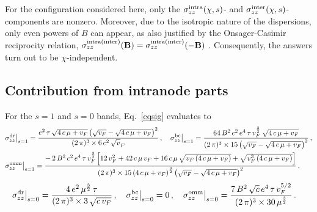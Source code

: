 \documentclass[aps,prb,onecolumn,nofootinbib,citeautoscript,10pt]{revtex4-2}
\def \nn{\nonumber \\}
\begin{document}
For the configuration considered here, only the $\sigma^{\rm intra}_{zz} (\chi, s)$- and $\sigma^{\rm inter}_{zz} (\chi, s)$-components are nonzero. Moreover, due to the isotropic nature of the dispersions, only even powers of $B$ can appear, as also justified by the Onsager-Casimir reciprocity relation, $\sigma^{\rm intra(inter)}_{zz} (\mathbf{B})= \sigma^{\rm intra(inter)}_{zz} (-\mathbf{B})$ \cite{onsager31_reciprocal, onsager2, onsager3}. Consequently, the answers turn out to be $\chi$-independent.


\subsection{Contribution from intranode parts}


For the $s=1$ and $s=0$ bands, Eq.~\eqref{eqsig} evaluates to
\begin{align}
&  \sigma_{zz}^{\rm dr} \big \vert_{s=1} =
\frac{e^2\, \tau \, \sqrt{ 4 \, c \, \mu  + v_F } 
\left(\sqrt{v_F}-\sqrt{4 \, c \, \mu +v_F}\right)^2} 
{(2\,\pi)^3 \times 6 \, c^2 \, \sqrt v_F}
\,, \quad
\sigma_{zz}^{\rm bc} \big \vert_{s=1} =
\frac{64 \,B^2 \,c^2 \,e^4 \,\tau \, v_F^{\frac{3} {2} } 
\;\sqrt{4 \,c \, \mu + v_F}}
{(2\,\pi)^3 \times  15 \left(\sqrt{v_F}-\sqrt{4\, c \,\mu +v_F}\right)^2}\,,
\nn & \sigma_{zz}^{\rm omm} \big \vert_{s=1} =
\frac{ - \,2 \,B^2 \,c^2 \,e^4 \,\tau  \,v_F^{\frac{3} {2} } 
\left[  12  \,v_F^2
+ 42 \, c  \,\mu  \, v_F + 16  \,c \, \mu  \,
 \sqrt{ v_F \left(4  \,c  \,\mu + v_F\right)}
 + \sqrt{ v_F^3
   \left(4  \, c  \,\mu +v_F\right)} \right ]}
   {(2\,\pi)^3 \times  15 \left(4  \,c  \,\mu +v_F\right)^{\frac{3} {2} } \left(\sqrt{v_F}
  -\sqrt{4  \, c  \, \mu  + v_F} \right )^2} \,,
\end{align}
\begin{align}
&  \sigma_{zz}^{\rm dr} \big \vert_{s=0} = 
\frac{4 \,e^2\, \mu ^{\frac{3} {2} } \,\tau }  {(2\,\pi)^3 \times  3 \, \sqrt{c \,v_F} } \,,\quad
\sigma_{zz}^{\rm bc} \big \vert_{s=0} = 0\,,\quad
\sigma_{zz}^{\rm omm} \big \vert_{s=0} =
\frac{7\, B^2\, \sqrt{c} \,e^4 \,\tau \, v_F^{5/2}}
{ (2\,\pi)^3 \times  30 \, \mu ^{\frac{3} {2} }}\,.
\end{align}
\end{document}
